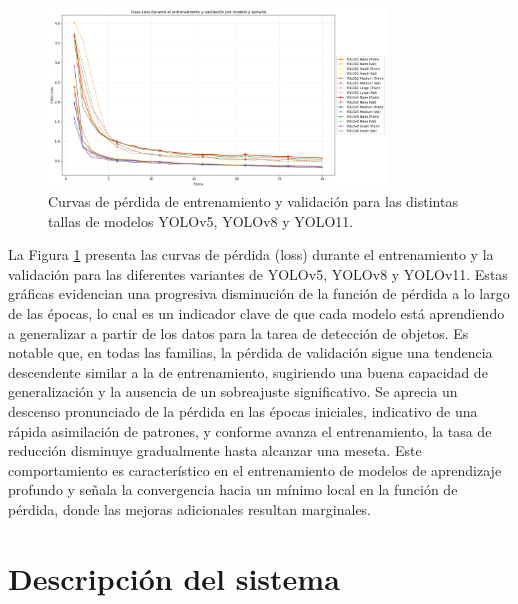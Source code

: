\documentclass[11pt,spanish,listoffigures,listoftables]{tfgetsinf}
\begin{document}
\begin{figure}[H]
   \centering
   \includegraphics[width=0.8\textwidth]{excels/entrenamiento/loss_plot.png}
   \caption[Curvas de pérdida de entrenamiento y validación para las distintas tallas de modelos YOLOv5, YOLOv8 y YOLO11]{Curvas de pérdida de entrenamiento y validación para las distintas tallas de modelos YOLOv5, YOLOv8 y YOLO11.}
   \label{fig:loss_curves}
\end{figure}

La Figura \ref{fig:loss_curves} presenta las curvas de pérdida (loss) durante el entrenamiento y la validación para las diferentes variantes de YOLOv5, YOLOv8 y YOLOv11. Estas gráficas evidencian una progresiva disminución de la función de pérdida a lo largo de las épocas, lo cual es un indicador clave de que cada modelo está aprendiendo a generalizar a partir de los datos para la tarea de detección de objetos. Es notable que, en todas las familias, la pérdida de validación sigue una tendencia descendente similar a la de entrenamiento, sugiriendo una buena capacidad de generalización y la ausencia de un sobreajuste significativo. Se aprecia un descenso pronunciado de la pérdida en las épocas iniciales, indicativo de una rápida asimilación de patrones, y conforme avanza el entrenamiento, la tasa de reducción disminuye gradualmente hasta alcanzar una meseta. Este comportamiento es característico en el entrenamiento de modelos de aprendizaje profundo y señala la convergencia hacia un mínimo local en la función de pérdida, donde las mejoras adicionales resultan marginales.



\section{Descripción del sistema} \label{sec:descripcion_sistema}
\end{document}
